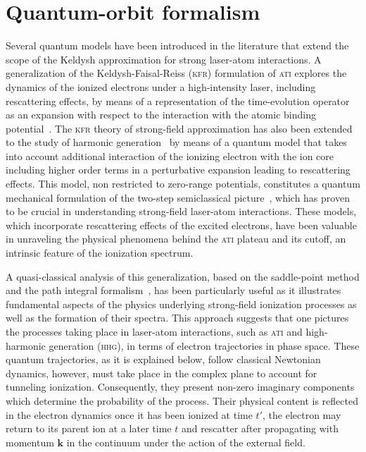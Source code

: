 

\section{\label{sec:q_paths} Quantum-orbit formalism}

Several quantum models have been introduced in the literature that
extend the scope of the Keldysh approximation for strong laser-atom
interactions. A generalization of the Keldysh-Faisal-Reiss
(\textsc{kfr}) formulation of \textsc{ati} explores the dynamics of
the ionized electrons under a high-intensity laser, including
rescattering effects, by means of a representation of the
time-evolution operator as an expansion with respect to the
interaction with the atomic binding
potential~\cite{Kopold_1997sfa}. The \textsc{kfr} theory of
strong-field approximation has also been extended to the study of
harmonic generation~\cite{LewensteinSPA_1994,Lewenstein_1995} by means
of a quantum model that takes into account additional interaction of
the ionizing electron with the ion core including higher order terms
in a perturbative expansion leading to rescattering effects. This
model, non restricted to zero-range potentials, constitutes a quantum
mechanical formulation of the two-step semiclassical
picture~\cite{Becker_2step1986}, which has proven to be crucial in
understanding strong-field laser-atom interactions. These models,
which incorporate rescattering effects of the excited electrons, have
been valuable in unraveling the physical phenomena behind the
\textsc{ati} plateau and its cutoff, an intrinsic feature of the
ionization spectrum.

A quasi-classical analysis of this generalization, based on the
saddle-point method and the path integral
formalism~\cite{KopoldOptComm2000,Becker_ellipticalSPA,LewScience2001},
has been particularly useful as it illustrates fundamental aspects of
the physics underlying strong-field ionization processes as well as
the formation of their spectra. This approach suggests that one
pictures the processes taking place in laser-atom interactions, such
as \textsc{ati} and high-harmonic generation (\textsc{hhg}), in terms
of electron trajectories in phase space. These quantum trajectories,
as it is explained below, follow classical Newtonian dynamics,
however, must take place in the complex plane to account for tunneling
ionization. Consequently, they present non-zero imaginary components
which determine the probability of the process. Their physical content
is reflected in the electron dynamics once it has been ionized at time
$t'$, the electron may return to its parent ion at a later time $t$
and rescatter after propagating with momentum $\mathbf{k}$ in the
continuum under the action of the external field.

